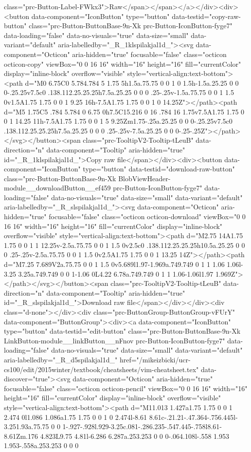{{{{{class="prc-Button-Label-FWkx3">Raw</span></span></a></div><div><button data-component="IconButton" type="button" data-testid="copy-raw-button" class="prc-Button-ButtonBase-9n-Xk prc-Button-IconButton-fyge7" data-loading="false" data-no-visuals="true" data-size="small" data-variant="default" aria-labelledby="_R_1klspilakjal1d_"><svg data-component="Octicon" aria-hidden="true" focusable="false" class="octicon octicon-copy" viewBox="0 0 16 16" width="16" height="16" fill="currentColor" display="inline-block" overflow="visible" style="vertical-align:text-bottom"><path d="M0 6.75C0 5.784.784 5 1.75 5h1.5a.75.75 0 0 1 0 1.5h-1.5a.25.25 0 0 0-.25.25v7.5c0 .138.112.25.25.25h7.5a.25.25 0 0 0 .25-.25v-1.5a.75.75 0 0 1 1.5 0v1.5A1.75 1.75 0 0 1 9.25 16h-7.5A1.75 1.75 0 0 1 0 14.25Z"></path><path d="M5 1.75C5 .784 5.784 0 6.75 0h7.5C15.216 0 16 .784 16 1.75v7.5A1.75 1.75 0 0 1 14.25 11h-7.5A1.75 1.75 0 0 1 5 9.25Zm1.75-.25a.25.25 0 0 0-.25.25v7.5c0 .138.112.25.25.25h7.5a.25.25 0 0 0 .25-.25v-7.5a.25.25 0 0 0-.25-.25Z"></path></svg></button><span class="prc-TooltipV2-Tooltip-tLeuB" data-direction="n" data-component="Tooltip" aria-hidden="true" id="_R_1klspilakjal1d_">Copy raw file</span></div><div><button data-component="IconButton" type="button" data-testid="download-raw-button" class="prc-Button-ButtonBase-9n-Xk BlobViewHeader-module__downloadButton__ef459 prc-Button-IconButton-fyge7" data-loading="false" data-no-visuals="true" data-size="small" data-variant="default" aria-labelledby="_R_slspilakjal1d_"><svg data-component="Octicon" aria-hidden="true" focusable="false" class="octicon octicon-download" viewBox="0 0 16 16" width="16" height="16" fill="currentColor" display="inline-block" overflow="visible" style="vertical-align:text-bottom"><path d="M2.75 14A1.75 1.75 0 0 1 1 12.25v-2.5a.75.75 0 0 1 1.5 0v2.5c0 .138.112.25.25.25h10.5a.25.25 0 0 0 .25-.25v-2.5a.75.75 0 0 1 1.5 0v2.5A1.75 1.75 0 0 1 13.25 14Z"></path><path d="M7.25 7.689V2a.75.75 0 0 1 1.5 0v5.689l1.97-1.969a.749.749 0 1 1 1.06 1.06l-3.25 3.25a.749.749 0 0 1-1.06 0L4.22 6.78a.749.749 0 1 1 1.06-1.06l1.97 1.969Z"></path></svg></button><span class="prc-TooltipV2-Tooltip-tLeuB" data-direction="n" data-component="Tooltip" aria-hidden="true" id="_R_slspilakjal1d_">Download raw file</span></div></div><div class="d-none"></div><div class="prc-ButtonGroup-ButtonGroup-vFUrY" data-component="ButtonGroup"><div><a data-component="IconButton" type="button" data-testid="edit-button" class="prc-Button-ButtonBase-9n-Xk LinkButton-module__linkButton__nFnov prc-Button-IconButton-fyge7" data-loading="false" data-no-visuals="true" data-size="small" data-variant="default" aria-labelledby="_R_d5spilakjal1d_" href="/mikeizbicki/ucr-cs100/edit/2015winter/textbook/cheatsheets/vim-cheatsheet.tex" data-discover="true"><svg data-component="Octicon" aria-hidden="true" focusable="false" class="octicon octicon-pencil" viewBox="0 0 16 16" width="16" height="16" fill="currentColor" display="inline-block" overflow="visible" style="vertical-align:text-bottom"><path d="M11.013 1.427a1.75 1.75 0 0 1 2.474 0l1.086 1.086a1.75 1.75 0 0 1 0 2.474l-8.61 8.61c-.21.21-.47.364-.756.445l-3.251.93a.75.75 0 0 1-.927-.928l.929-3.25c.081-.286.235-.547.445-.758l8.61-8.61Zm.176 4.823L9.75 4.81l-6.286 6.287a.253.253 0 0 0-.064.108l-.558 1.953 1.953-.558a.253.253 0 0 0 }}}}}
